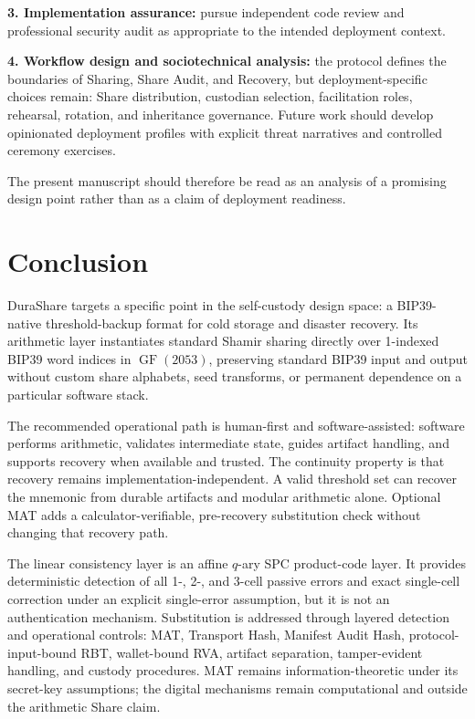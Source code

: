 \documentclass[11pt]{article}
\newcommand{\GF}{\operatorname{GF}}
\begin{document}
\textbf{3. Implementation assurance:} pursue independent code review and professional security audit as appropriate to the intended deployment context.

\textbf{4. Workflow design and sociotechnical analysis:} the protocol defines the boundaries of Sharing, Share Audit, and Recovery, but deployment-specific choices remain: Share distribution, custodian selection, facilitation roles, rehearsal, rotation, and inheritance governance. Future work should develop opinionated deployment profiles with explicit threat narratives and controlled ceremony exercises.

The present manuscript should therefore be read as an analysis of a promising design point rather than as a claim of deployment readiness.

\section{Conclusion}
\label{sec:conclusion}

DuraShare targets a specific point in the self-custody design space: a BIP39-native threshold-backup format for cold storage and disaster recovery. Its arithmetic layer instantiates standard Shamir sharing directly over 1-indexed BIP39 word indices in $\GF(2053)$, preserving standard BIP39 input and output without custom share alphabets, seed transforms, or permanent dependence on a particular software stack.

The recommended operational path is human-first and software-assisted: software performs arithmetic, validates intermediate state, guides artifact handling, and supports recovery when available and trusted. The continuity property is that recovery remains implementation-independent. A valid threshold set can recover the mnemonic from durable artifacts and modular arithmetic alone. Optional MAT adds a calculator-verifiable, pre-recovery substitution check without changing that recovery path.

The linear consistency layer is an affine $q$-ary SPC product-code layer. It provides deterministic detection of all 1-, 2-, and 3-cell passive errors and exact single-cell correction under an explicit single-error assumption, but it is not an authentication mechanism. Substitution is addressed through layered detection and operational controls: MAT, Transport Hash, Manifest Audit Hash, protocol-input-bound RBT, wallet-bound RVA, artifact separation, tamper-evident handling, and custody procedures. MAT remains information-theoretic under its secret-key assumptions; the digital mechanisms remain computational and outside the arithmetic Share claim.
\end{document}
